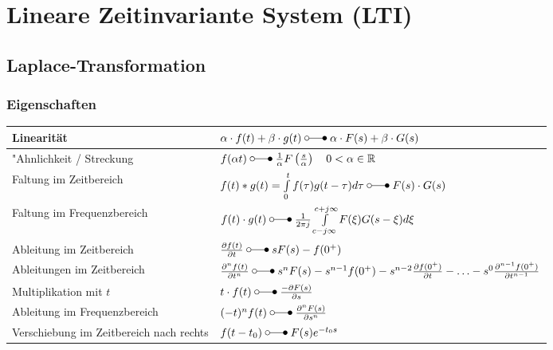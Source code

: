 \section{Lineare Zeitinvariante System (LTI) }
\subsection{Laplace-Transformation  }


 	\subsubsection{Eigenschaften }
  		\renewcommand{\arraystretch}{2}
  				\begin{tabular}{|l|l|}
  		        	\hline
  		        	Linearität & 
  		 			$\alpha\cdot f(t) + \beta\cdot g(t) \; \laplace \; \alpha\cdot F(s) + \beta\cdot
  		 			G(s)$ \\
  		 			\hline
  		 			"Ahnlichkeit / Streckung &
  		 			$f(\alpha t) \; \laplace \; \frac{1}{\alpha}F \left (\frac{s}{\alpha} \right ) \quad 0
  		 			<\alpha \in\mathbb{R}$ \\
  		 			\hline
  		 			Faltung im Zeitbereich &
  		 			$f(t) \ast g(t) = \int\limits_{0}^{t} f(\tau)g(t-\tau)d\tau \; \laplace \; F(s)
  		 			\cdot G(s)$\\
  		 			\hline
  		 			Faltung im Frequenzbereich &
  		 			$f(t) \cdot g(t) \; \laplace \; \frac{1}{2\pi j}\int\limits_{c-j\infty}^{c+j\infty}
  		 			F(\xi) G(s-\xi)d\xi$ \\
  		 			\hline
  		 			Ableitung im Zeitbereich &
  		 			$\frac{\partial f(t)}{\partial t} \; \laplace \; sF(s)
  		 			-f(0^+)$ \\
  		 			\hline
  		 			Ableitungen im Zeitbereich &
  		 			$\frac{\partial^n f(t)}{\partial t^n} \; \laplace \; s^nF(s)
  		 			-s^{n-1}f(0^+)-s^{n-2}\frac{\partial f(0^+)}{\partial t}-\ldots
  		 			-s^0\frac{\partial^{n-1} f(0^+)}{\partial t^{n-1}}$ \\
  		 			\hline
  		 			Multiplikation mit $t$ &
  		 			$t\cdot f(t)  \; \laplace \; \frac{-\partial F(s)}{\partial s}$ \\
  		 			\hline
  		 			Ableitung im Frequenzbereich &
  		 			$(-t)^n f(t) \; \laplace \;  \frac{\partial^n F(s)}{\partial s^n}$ \\
  		 			\hline
  		 			Verschiebung im Zeitbereich nach rechts &
  		 			$f(t - t_0) \; \laplace \; F(s)e^{- t_0 s}$ \\
  		 			\hline

\end{tabular}
